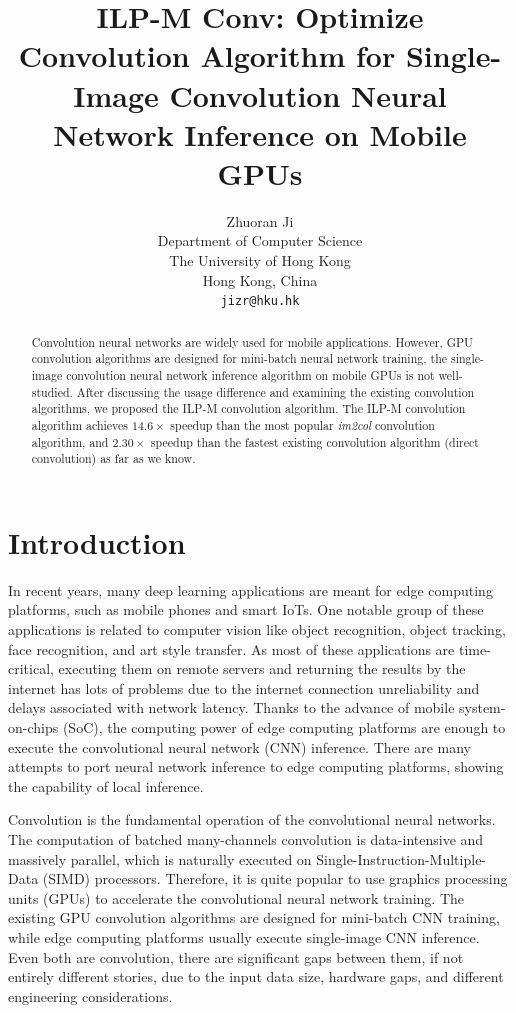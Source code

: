 \documentclass{article}
\title{ILP-M Conv: Optimize Convolution Algorithm for Single-Image Convolution Neural Network Inference on Mobile GPUs}
\author{
  Zhuoran Ji \\
  Department of Computer Science\\
  The University of Hong Kong\\
  Hong Kong, China \\
  \texttt{jizr@hku.hk} \\
}
\begin{document}
\maketitle

\begin{abstract}
Convolution neural networks are widely used for mobile applications. However, GPU convolution algorithms are designed for mini-batch neural network training, the single-image convolution neural network inference algorithm on mobile GPUs is not well-studied. After discussing the usage difference and examining the existing convolution algorithms, we proposed the ILP-M convolution algorithm. The ILP-M convolution algorithm achieves $14.6 \times$ speedup than the most popular \textit{im2col} convolution algorithm, and $2.30 \times$ speedup than the fastest existing convolution algorithm (direct convolution) as far as we know. 
\end{abstract}




\section{Introduction}

In recent years, many deep learning applications are meant for edge computing platforms, such as mobile phones and smart IoTs. One notable group of these applications is related to computer vision like object recognition, object tracking, face recognition, and art style transfer. As most of these applications are time-critical, executing them on remote servers and returning the results by the internet has lots of problems due to the internet connection unreliability and delays associated with network latency. Thanks to the advance of mobile system-on-chips (SoC), the computing power of edge computing platforms are enough to execute the convolutional neural network (CNN) inference. There are many attempts to port neural network inference to edge computing platforms, showing the capability of local inference.

Convolution is the fundamental operation of the convolutional neural networks. The computation of batched many-channels convolution is data-intensive and massively parallel, which is naturally executed on Single-Instruction-Multiple-Data (SIMD) processors. Therefore, it is quite popular to use graphics processing units (GPUs) to accelerate the convolutional neural network training. The existing GPU convolution algorithms are designed for mini-batch CNN training, while edge computing platforms usually execute single-image CNN inference. Even both are convolution, there are significant gaps between them, if not entirely different stories, due to the input data size, hardware gaps, and different engineering considerations.
\end{document}
